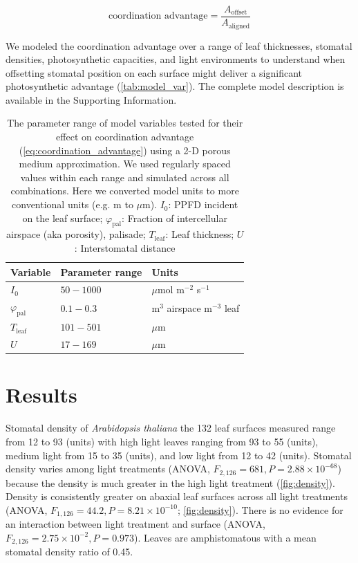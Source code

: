 \documentclass[12pt,halfline,a4paper,]{ouparticle}
\begin{document}
\begin{equation} \label{eq:coordination_advantage}
  \text{coordination advantage} = \frac{A_\text{offset}}{A_\text{aligned}}
\end{equation}

We modeled the coordination advantage over a range of leaf thicknesses,
stomatal densities, photosynthetic capacities, and light environments to
understand when offsetting stomatal position on each surface might
deliver a significant photosynthetic advantage
(\autoref{tab:model_var}). The complete model description is available
in the Supporting Information.

\begin{table}

\caption{\label{tab:model_var}The parameter range of model variables tested for their effect on coordination advantage (\autoref{eq:coordination_advantage}) using a 2-D porous medium approximation. We used regularly spaced values within each range and simulated across all combinations. Here we converted model units to more conventional units (e.g. m to $\mu$m). $I_0$: PPFD incident on the leaf surface; $\varphi_\text{pal}$: Fraction of intercellular airspace (aka porosity), palisade; $T_\text{leaf}$: Leaf thickness; $U$: Interstomatal distance}
\centering
\begin{tabular}[t]{lll}
\toprule
Variable & Parameter range & Units\\
\midrule
$I_0$ & $50-1000$ & $\mu$mol m$^{-2}$ s$^{-1}$\\
$\varphi_\text{pal}$ & $0.1-0.3$ & m$^3$ airspace m$^{-3}$ leaf\\
$T_\text{leaf}$ & $101-501$ & $\mu$m\\
$U$ & $17-169$ & $\mu$m\\
\bottomrule
\end{tabular}
\end{table}

\hypertarget{results}{%
\section{Results}\label{results}}

Stomatal density of \emph{Arabidopsis thaliana} the 132 leaf surfaces
measured range from 12 to 93 (units) with high light leaves ranging from
93 to 55 (units), medium light from 15 to 35 (units), and low light from
12 to 42 (units). Stomatal density varies among light treatments (ANOVA,
\(F_{2,126} = 681, P = 2.88 \times 10^{-68}\)) because the density is
much greater in the high light treatment (\autoref{fig:density}).
Density is consistently greater on abaxial leaf surfaces across all
light treatments (ANOVA, \(F_{1,126} = 44.2, P = 8.21 \times 10^{-10}\);
\autoref{fig:density}). There is no evidence for an interaction between
light treatment and surface (ANOVA,
\(F_{2,126} = 2.75 \times 10^{-2}, P = 0.973\)). Leaves are
amphistomatous with a mean stomatal density ratio of 0.45.
\end{document}

